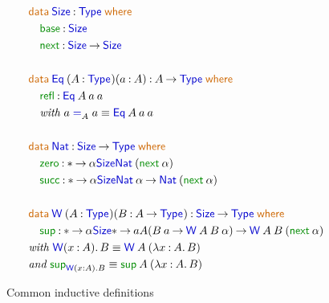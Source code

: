 \documentclass{article}
\newcommand{\ind}[1]{\mathsf{\textcolor{indcolour}{#1}}}
\newcommand{\constr}[1]{\mathsf{\textcolor{constrcolour}{#1}}}
\newcommand{\kw}[1]{\mathsf{\textcolor{kwcolour}{#1}}}
\newcommand{\kwopen}[1]{\kw{#1}\:}
\newcommand{\kwbin}[1]{\:\kw{#1}\:}
\newcommand{\arr}[2]{#1 \mathbin{\rightarrow} #2}
\newcommand{\lam}[3]{\lambda #1 \mathbin{:} #2 \mathpunct{.} #3}
\newcommand{\app}[2]{#1 \: #2}
\newcommand{\Type}[1]{\ind{Type}_{#1}}
\newcommand{\data}[3]{\kwopen{data} #1 \mathbin{:} #2 \kwbin{where} #3}
\newcommand{\annot}[2]{#1 \mathbin{:} #2}
\newcommand{\Size}{\ind{Size}}
\newcommand{\base}{\constr{base}}
\newcommand{\next}{\constr{next}}
\newcommand{\Eq}{\ind{Eq}}
\newcommand{\refl}{\constr{refl}}
\renewcommand{\equal}[4]{#1 \mathrel{\ind{=}}_{#2}^{#3} #1}
\newcommand{\Pair}[3]{\mathopen{\ind{(}} #1 \mathbin{:} #2 \mathbin{\ind{\times}} #3 \mathclose{\ind{)}}}
\newcommand{\pair}[2]{\mathopen{\constr{(}} #1 \mathpunct{\constr{,}} #2 \mathclose{\constr{)}}}
\newcommand{\Nat}{\ind{Nat}}
\newcommand{\Wtype}{\ind{W}}
\renewcommand{\sup}{\ind{\constr{sup}}}
\begin{document}
\begin{figure}[h]
    \centering
    \begin{align*}
        &\data{\Size}{\Type{}}{ \\
        &\quad\annot{\base}{\Size} \\
        &\quad\annot{\next}{\arr{\Size}{\Size}}} \\
        \hfill \\
        &\data{\app{\Eq}{(\annot{A}{\Type{}})(\annot{a}{A})}}{\arr{A}{\Type{}}}{ \\
        &\quad\annot{\refl}{\app{\app{\app{\Eq}{A}}{a}}{a}}}\\
        &\quad\textit{with} ~ \equal{a}{A}{}{a} \equiv \app{\app{\app{\Eq}{A}}{a}}{a} \\
        \hfill \\
        &\data{\Nat}{\arr{\Size}{\Type{}}}{ \\
        &\quad \annot{\constr{zero}}{\arr*{\alpha}{\Size}{\app{\Nat}{(\app{\next}{\alpha})}}} \\
        &\quad \annot{\constr{succ}}{\arr*{\alpha}{\Size}{\arr{\app{\Nat}{\alpha}}{\app{\Nat}{(\app{\next}{\alpha})}}}}} \\
        \hfill \\
        &\data{\app{\Wtype}{(\annot{A}{\Type{}})(\annot{B}{\arr{A}{\Type{}}})}}{\arr{\Size}{\Type{}}}{ \\
        &\quad \annot{\sup}{\arr*{\alpha}{\Size}{\arr*{a}{A}{\arr{(\arr{\app{B}{a}}{\app{\app{\app{\Wtype}{A}}{B}}{\alpha}})}{\app{\app{\app{\Wtype}{A}}{B}}{(\app{\next}{\alpha})}}}}}} \\
        &\textit{with} ~ \Wtype(\annot{x}{A}) \mathpunct{.} B \equiv \app{\app{\Wtype}{A}}{(\lam{x}{A}{B})} \\
        &\textit{and} ~ \sup_{\Wtype(\annot{x}{A}) \mathpunct{.} B} \equiv \app{\app{\sup}{A}}{(\lam{x}{A}{B})} \\
        \iffalse
        \hfill \\
        &\data{\app{\ind{Pair}}{(\annot{A}{\Type{}})(\annot{B}{\arr{A}{\Type{}}})}}{\Type{}}{ \\
        &\quad \annot{\constr{pair}}{\arr*{a}{A}{\arr{\app{B}{a}}{\app{\app{\ind{Pair}}{A}}{B}}}}} \\
        &\textit{with} ~ \Pair{x}{A}{B} \equiv \app{\app{\ind{Pair}}{A}}{(\lam{x}{A}{B})} \\
        &\textit{and} ~ \pair{a}{b}_{\Pair{x}{A}{B}} \equiv \app{\app{\app{\app{\constr{pair}}{A}}{(\lam{x}{A}{B})}}{a}}{b} \\
        \fi
    \end{align*}
    \caption{Common inductive definitions}
    \label{fig:ind-defs}
\end{figure}
\end{document}

